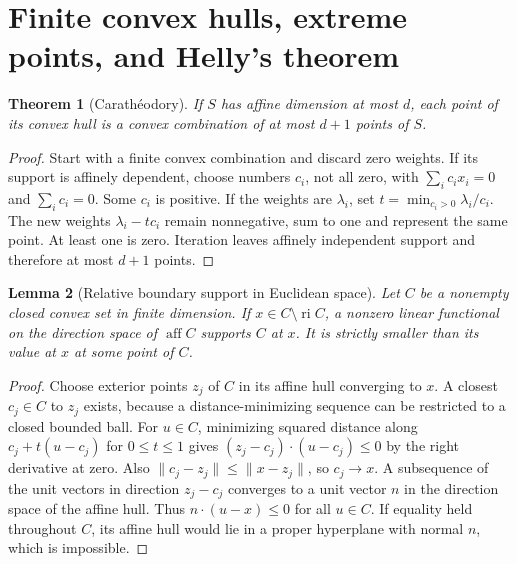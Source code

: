 \documentclass[11pt,oneside,openany]{book}
\theoremstyle{plain}
\newtheorem{theorem}{Theorem}[chapter]
\newtheorem{lemma}[theorem]{Lemma}
\theoremstyle{definition}
\theoremstyle{remark}
\begin{document}
\section{Finite convex hulls, extreme points, and Helly's theorem}\label{v01-03}

\begin{theorem}[Carath\'eodory]\label{thm:caratheodory}
If \(S\) has affine dimension at most \(d\), each point of its convex
hull is a convex combination of at most \(d+1\) points of \(S\).
\end{theorem}

\begin{proof}
Start with a finite convex combination and discard zero weights.
If its support is affinely dependent, choose numbers
\(c_i\), not all zero, with \(\sum_i c_i x_i=0\) and \(\sum_i c_i=0\).
Some \(c_i\) is positive. If the weights are \(\lambda_i\), set
\(t=\min_{c_i>0}\lambda_i/c_i\). The new weights
\(\lambda_i-tc_i\) remain nonnegative, sum to one and represent the
same point. At least one is zero. Iteration leaves affinely
independent support and therefore at most \(d+1\) points.
\end{proof}

\begin{lemma}[Relative boundary support in Euclidean space]
\label{lem:euclidean-boundary-support}
Let \(C\) be a nonempty closed convex set in finite dimension.
If \(x\in C\setminus\operatorname{ri}C\), a nonzero linear functional
on the direction space of \(\operatorname{aff}C\) supports \(C\) at \(x\).
It is strictly smaller than its value at \(x\) at some point of \(C\).
\end{lemma}

\begin{proof}
Choose exterior points \(z_j\) of \(C\) in its affine hull converging
to \(x\). A closest \(c_j\in C\) to \(z_j\) exists, because
a distance-minimizing sequence can be restricted to a closed bounded
ball. For \(u\in C\), minimizing squared distance along
\(c_j+t(u-c_j)\) for \(0\le t\le 1\) gives
\((z_j-c_j)\cdot(u-c_j)\le0\) by the right derivative at zero.
Also \(\lVert c_j-z_j\rVert\le \lVert x-z_j\rVert\), so \(c_j\to x\).
A subsequence of the unit vectors in direction \(z_j-c_j\)
converges to a unit vector \(n\) in the direction space of the
affine hull. Thus \(n\cdot(u-x)\le0\) for all \(u\in C\).
If equality held throughout \(C\), its affine hull would lie in
a proper hyperplane with normal \(n\), which is impossible.
\end{proof}
\end{document}
